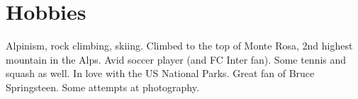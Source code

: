 \documentclass[a4paper]{moderncv}
\begin{document}
\section{Hobbies}
Alpinism, rock climbing, skiing. Climbed to the top of Monte Rosa, 2nd highest mountain in the Alps.
\newline{}
Avid soccer player (and FC Inter fan). Some tennis and squash as well. In love with the US National Parks.
\newline{}
Great fan of Bruce Springsteen. Some attempts at photography.%



 
\end{document}
